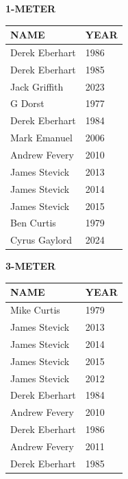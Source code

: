 \begin{table}[H]
\centering
\begin{minipage}[t]{0.6\textwidth}
\centering
\textbf{1-METER}\\[0.1cm]
\begin{tabular}{@{}p{2.8cm}p{1.2cm}@{}}
\hline
    \textbf{NAME} & \textbf{YEAR} \\
\hline
    Derek Eberhart & 1986 \\
    Derek Eberhart & 1985 \\
    Jack Griffith & 2023 \\
    G Dorst & 1977 \\
    Derek Eberhart & 1984 \\
    Mark Emanuel & 2006 \\
    Andrew Fevery & 2010 \\
    James Stevick & 2013 \\
    James Stevick & 2014 \\
    James Stevick & 2015 \\
    Ben Curtis & 1979 \\
    Cyrus Gaylord & 2024 \\
\hline
\end{tabular}
\end{minipage}
\end{table}

\begin{table}[H]
\centering
\begin{minipage}[t]{0.6\textwidth}
\centering
\textbf{3-METER}\\[0.1cm]
\begin{tabular}{@{}p{2.8cm}p{1.2cm}@{}}
\hline
    \textbf{NAME} & \textbf{YEAR} \\
\hline
    Mike Curtis & 1979 \\
    James Stevick & 2013 \\
    James Stevick & 2014 \\
    James Stevick & 2015 \\
    James Stevick & 2012 \\
    Derek Eberhart & 1984 \\
    Andrew Fevery & 2010 \\
    Derek Eberhart & 1986 \\
    Andrew Fevery & 2011 \\
    Derek Eberhart & 1985 \\
\hline
\end{tabular}
\end{minipage}
\end{table}


